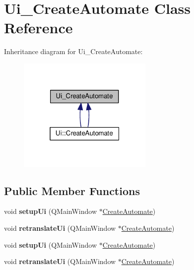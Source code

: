 \hypertarget{class_ui___create_automate}{\section{Ui\-\_\-\-Create\-Automate Class Reference}
\label{class_ui___create_automate}
}


Inheritance diagram for Ui\-\_\-\-Create\-Automate\-:
\nopagebreak
\begin{figure}[H]
\begin{center}
\leavevmode
\includegraphics[width=184pt]{class_ui___create_automate__inherit__graph}
\end{center}
\end{figure}
\subsection*{Public Member Functions}
\begin{DoxyCompactItemize}
\item 
\hypertarget{class_ui___create_automate_adc1c604839808d7f0699c4c2075d119c}{void {\bfseries setup\-Ui} (Q\-Main\-Window $\ast$\hyperlink{class_create_automate}{Create\-Automate})}\label{class_ui___create_automate_adc1c604839808d7f0699c4c2075d119c}

\item 
\hypertarget{class_ui___create_automate_ac995057d86d1b7fd1f805ea116112e82}{void {\bfseries retranslate\-Ui} (Q\-Main\-Window $\ast$\hyperlink{class_create_automate}{Create\-Automate})}\label{class_ui___create_automate_ac995057d86d1b7fd1f805ea116112e82}

\item 
\hypertarget{class_ui___create_automate_adc1c604839808d7f0699c4c2075d119c}{void {\bfseries setup\-Ui} (Q\-Main\-Window $\ast$\hyperlink{class_create_automate}{Create\-Automate})}\label{class_ui___create_automate_adc1c604839808d7f0699c4c2075d119c}

\item 
\hypertarget{class_ui___create_automate_ac995057d86d1b7fd1f805ea116112e82}{void {\bfseries retranslate\-Ui} (Q\-Main\-Window $\ast$\hyperlink{class_create_automate}{Create\-Automate})}\label{class_ui___create_automate_ac995057d86d1b7fd1f805ea116112e82}

\end{DoxyCompactItemize}
